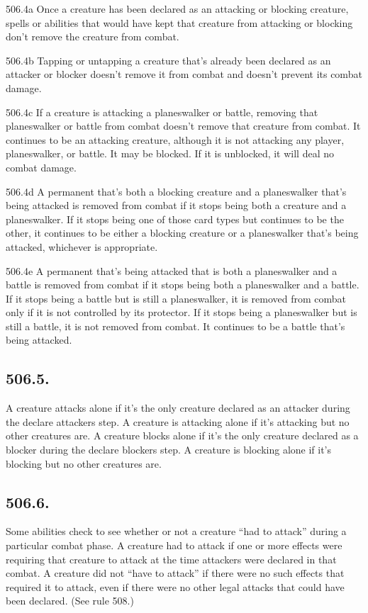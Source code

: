 506.4a Once a creature has been declared as an attacking or blocking creature, spells or abilities that would have kept that creature from attacking or blocking don’t remove the creature from combat.

506.4b Tapping or untapping a creature that’s already been declared as an attacker or blocker doesn’t remove it from combat and doesn’t prevent its combat damage.

506.4c If a creature is attacking a planeswalker or battle, removing that planeswalker or battle from combat doesn’t remove that creature from combat. It continues to be an attacking creature, although it is not attacking any player, planeswalker, or battle. It may be blocked. If it is unblocked, it will deal no combat damage.

506.4d A permanent that’s both a blocking creature and a planeswalker that’s being attacked is removed from combat if it stops being both a creature and a planeswalker. If it stops being one of those card types but continues to be the other, it continues to be either a blocking creature or a planeswalker that’s being attacked, whichever is appropriate.

506.4e A permanent that’s being attacked that is both a planeswalker and a battle is removed from combat if it stops being both a planeswalker and a battle. If it stops being a battle but is still a planeswalker, it is removed from combat only if it is not controlled by its protector. If it stops being a planeswalker but is still a battle, it is not removed from combat. It continues to be a battle that’s being attacked.

\subsection*{506.5.}
A creature attacks alone if it’s the only creature declared as an attacker during the declare attackers step. A creature is attacking alone if it’s attacking but no other creatures are. A creature blocks alone if it’s the only creature declared as a blocker during the declare blockers step. A creature is blocking alone if it’s blocking but no other creatures are.

\subsection*{506.6.}
Some abilities check to see whether or not a creature “had to attack” during a particular combat phase. A creature had to attack if one or more effects were requiring that creature to attack at the time attackers were declared in that combat. A creature did not “have to attack” if there were no such effects that required it to attack, even if there were no other legal attacks that could have been declared. (See rule 508.)

